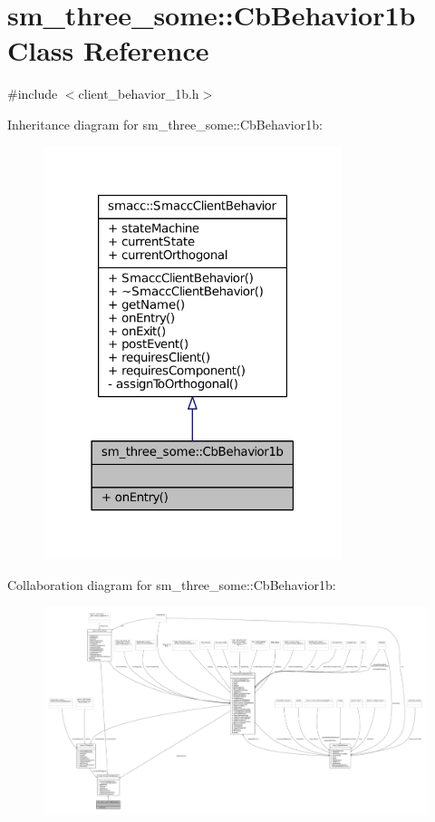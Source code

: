 \hypertarget{classsm__three__some_1_1CbBehavior1b}{}\section{sm\+\_\+three\+\_\+some\+:\+:Cb\+Behavior1b Class Reference}
\label{classsm__three__some_1_1CbBehavior1b}


{\ttfamily \#include $<$client\+\_\+behavior\+\_\+1b.\+h$>$}



Inheritance diagram for sm\+\_\+three\+\_\+some\+:\+:Cb\+Behavior1b\+:
\nopagebreak
\begin{figure}[H]
\begin{center}
\leavevmode
\includegraphics[width=247pt]{classsm__three__some_1_1CbBehavior1b__inherit__graph}
\end{center}
\end{figure}


Collaboration diagram for sm\+\_\+three\+\_\+some\+:\+:Cb\+Behavior1b\+:
\nopagebreak
\begin{figure}[H]
\begin{center}
\leavevmode
\includegraphics[width=350pt]{classsm__three__some_1_1CbBehavior1b__coll__graph}
\end{center}
\end{figure}
